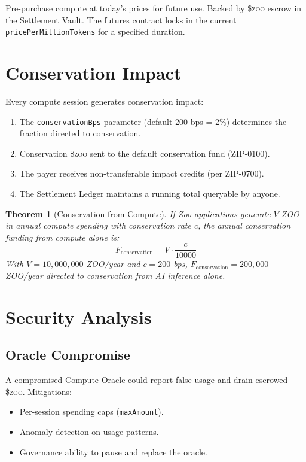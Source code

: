 \documentclass[11pt,letterpaper]{article}
\newtheorem{theorem}{Theorem}[section]
\newcommand{\ZOO}{\$\textsc{zoo}}
\begin{document}
Pre-purchase compute at today's prices for future use. Backed by \ZOO{} escrow in the Settlement Vault. The futures contract locks in the current \texttt{pricePerMillionTokens} for a specified duration.

\section{Conservation Impact}

Every compute session generates conservation impact:

\begin{enumerate}
    \item The \texttt{conservationBps} parameter (default 200 bps = 2\%) determines the fraction directed to conservation.
    \item Conservation \ZOO{} sent to the default conservation fund (ZIP-0100).
    \item The payer receives non-transferable impact credits (per ZIP-0700).
    \item The Settlement Ledger maintains a running total queryable by anyone.
\end{enumerate}

\begin{theorem}[Conservation from Compute]
If Zoo applications generate $V$ ZOO in annual compute spending with conservation rate $c$, the annual conservation funding from compute alone is:
\begin{equation}
F_{\text{conservation}} = V \cdot \frac{c}{10000}
\end{equation}
With $V = 10{,}000{,}000$ ZOO/year and $c = 200$ bps, $F_{\text{conservation}} = 200{,}000$ ZOO/year directed to conservation from AI inference alone.
\end{theorem}

\section{Security Analysis}
\label{sec:security}

\subsection{Oracle Compromise}

A compromised Compute Oracle could report false usage and drain escrowed \ZOO{}. Mitigations:
\begin{itemize}
    \item Per-session spending caps (\texttt{maxAmount}).
    \item Anomaly detection on usage patterns.
    \item Governance ability to pause and replace the oracle.
\end{itemize}
\end{document}
